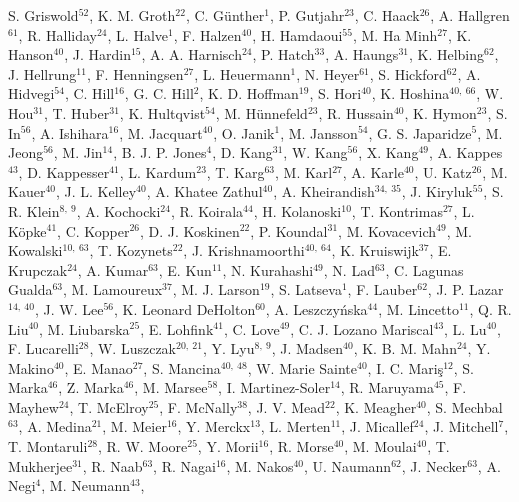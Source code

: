 S. Griswold$^{52}$,
K. M. Groth$^{22}$,
C. G{\"u}nther$^{1}$,
P. Gutjahr$^{23}$,
C. Haack$^{26}$,
A. Hallgren$^{61}$,
R. Halliday$^{24}$,
L. Halve$^{1}$,
F. Halzen$^{40}$,
H. Hamdaoui$^{55}$,
M. Ha Minh$^{27}$,
K. Hanson$^{40}$,
J. Hardin$^{15}$,
A. A. Harnisch$^{24}$,
P. Hatch$^{33}$,
A. Haungs$^{31}$,
K. Helbing$^{62}$,
J. Hellrung$^{11}$,
F. Henningsen$^{27}$,
L. Heuermann$^{1}$,
N. Heyer$^{61}$,
S. Hickford$^{62}$,
A. Hidvegi$^{54}$,
C. Hill$^{16}$,
G. C. Hill$^{2}$,
K. D. Hoffman$^{19}$,
S. Hori$^{40}$,
K. Hoshina$^{40,\: 66}$,
W. Hou$^{31}$,
T. Huber$^{31}$,
K. Hultqvist$^{54}$,
M. H{\"u}nnefeld$^{23}$,
R. Hussain$^{40}$,
K. Hymon$^{23}$,
S. In$^{56}$,
A. Ishihara$^{16}$,
M. Jacquart$^{40}$,
O. Janik$^{1}$,
M. Jansson$^{54}$,
G. S. Japaridze$^{5}$,
M. Jeong$^{56}$,
M. Jin$^{14}$,
B. J. P. Jones$^{4}$,
D. Kang$^{31}$,
W. Kang$^{56}$,
X. Kang$^{49}$,
A. Kappes$^{43}$,
D. Kappesser$^{41}$,
L. Kardum$^{23}$,
T. Karg$^{63}$,
M. Karl$^{27}$,
A. Karle$^{40}$,
U. Katz$^{26}$,
M. Kauer$^{40}$,
J. L. Kelley$^{40}$,
A. Khatee Zathul$^{40}$,
A. Kheirandish$^{34,\: 35}$,
J. Kiryluk$^{55}$,
S. R. Klein$^{8,\: 9}$,
A. Kochocki$^{24}$,
R. Koirala$^{44}$,
H. Kolanoski$^{10}$,
T. Kontrimas$^{27}$,
L. K{\"o}pke$^{41}$,
C. Kopper$^{26}$,
D. J. Koskinen$^{22}$,
P. Koundal$^{31}$,
M. Kovacevich$^{49}$,
M. Kowalski$^{10,\: 63}$,
T. Kozynets$^{22}$,
J. Krishnamoorthi$^{40,\: 64}$,
K. Kruiswijk$^{37}$,
E. Krupczak$^{24}$,
A. Kumar$^{63}$,
E. Kun$^{11}$,
N. Kurahashi$^{49}$,
N. Lad$^{63}$,
C. Lagunas Gualda$^{63}$,
M. Lamoureux$^{37}$,
M. J. Larson$^{19}$,
S. Latseva$^{1}$,
F. Lauber$^{62}$,
J. P. Lazar$^{14,\: 40}$,
J. W. Lee$^{56}$,
K. Leonard DeHolton$^{60}$,
A. Leszczy{\'n}ska$^{44}$,
M. Lincetto$^{11}$,
Q. R. Liu$^{40}$,
M. Liubarska$^{25}$,
E. Lohfink$^{41}$,
C. Love$^{49}$,
C. J. Lozano Mariscal$^{43}$,
L. Lu$^{40}$,
F. Lucarelli$^{28}$,
W. Luszczak$^{20,\: 21}$,
Y. Lyu$^{8,\: 9}$,
J. Madsen$^{40}$,
K. B. M. Mahn$^{24}$,
Y. Makino$^{40}$,
E. Manao$^{27}$,
S. Mancina$^{40,\: 48}$,
W. Marie Sainte$^{40}$,
I. C. Mari{\c{s}}$^{12}$,
S. Marka$^{46}$,
Z. Marka$^{46}$,
M. Marsee$^{58}$,
I. Martinez-Soler$^{14}$,
R. Maruyama$^{45}$,
F. Mayhew$^{24}$,
T. McElroy$^{25}$,
F. McNally$^{38}$,
J. V. Mead$^{22}$,
K. Meagher$^{40}$,
S. Mechbal$^{63}$,
A. Medina$^{21}$,
M. Meier$^{16}$,
Y. Merckx$^{13}$,
L. Merten$^{11}$,
J. Micallef$^{24}$,
J. Mitchell$^{7}$,
T. Montaruli$^{28}$,
R. W. Moore$^{25}$,
Y. Morii$^{16}$,
R. Morse$^{40}$,
M. Moulai$^{40}$,
T. Mukherjee$^{31}$,
R. Naab$^{63}$,
R. Nagai$^{16}$,
M. Nakos$^{40}$,
U. Naumann$^{62}$,
J. Necker$^{63}$,
A. Negi$^{4}$,
M. Neumann$^{43}$,
